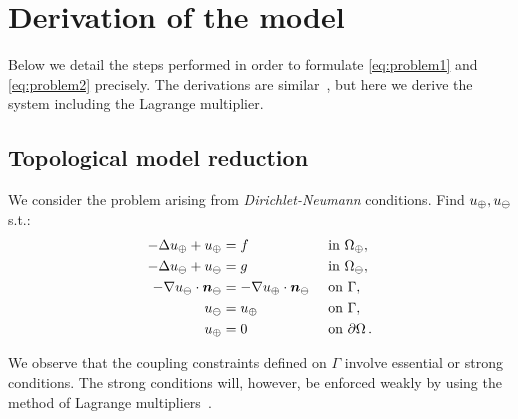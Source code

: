 \section{Derivation of the model}
Below we detail the steps performed in order to formulate \ref{eq:problem1} and \ref{eq:problem2} precisely. 
The derivations are similar~\cite{laurino_m2an},  but here we derive the system including the Lagrange multiplier. 

\subsection{Topological model reduction}

We consider the problem arising from \emph{Dirichlet-Neumann} conditions. Find $u_{\oplus},u_{\ominus}$ s.t.:
\begin{subequations}\label{eq:dirneu}
\begin{align}
\label{eq:dirneu1}
- \Delta \up  + \up &= f  && \text{ in } \Omega_{\oplus},\\
\label{eq:dirneu2}
- \Delta \uf  + \uf &= g  && \text{ in } \Omega_\ominus,\\
\label{eq:dirneu3}
-\nabla \uf \cdot \nn_{\ominus} &= -\nabla \up \cdot \nn_{\ominus}  && \text{ on } \Gamma,\\
\label{eq:dirneu4}
\uf &= \up && \text{ on }  \Gamma,\\
\label{eq:dirneu5}
\up &= 0 && \text{ on } \partial \Omega\,.
\end{align}
\end{subequations}

We observe that the coupling constraints defined on $\Gamma$ involve essential or strong conditions.
The strong conditions will, however, be enforced weakly by using the method of Lagrange multipliers~\cite{MR359352}.

